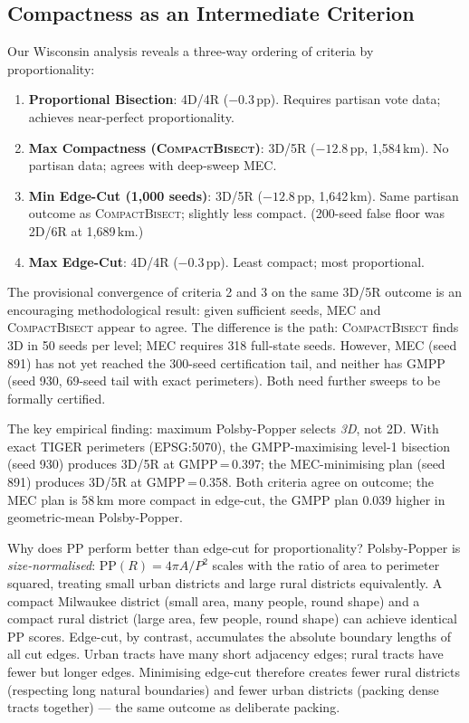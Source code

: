 \subsection{Compactness as an Intermediate Criterion}

Our Wisconsin analysis reveals a three-way ordering of criteria by
proportionality:

\begin{enumerate}
  \item \textbf{Proportional Bisection}: 4D/4R ($-0.3$\,pp). Requires
        partisan vote data; achieves near-perfect proportionality.
  \item \textbf{Max Compactness (\textsc{CompactBisect})}: 3D/5R ($-12.8$\,pp,
        1{,}584\,km). No partisan data; agrees with deep-sweep MEC.
  \item \textbf{Min Edge-Cut (1{,}000 seeds)}: 3D/5R ($-12.8$\,pp, 1{,}642\,km).
        Same partisan outcome as \textsc{CompactBisect}; slightly less compact.
        (200-seed false floor was 2D/6R at 1{,}689\,km.)
  \item \textbf{Max Edge-Cut}: 4D/4R ($-0.3$\,pp). Least compact; most proportional.
\end{enumerate}

The provisional convergence of criteria 2 and 3 on the same 3D/5R outcome
is an encouraging methodological result: given sufficient seeds, MEC and
\textsc{CompactBisect} appear to agree. The difference is the path:
\textsc{CompactBisect} finds 3D in 50 seeds per level; MEC requires 318
full-state seeds. However, MEC (seed 891) has not yet reached the 300-seed
certification tail, and neither has GMPP (seed 930, 69-seed tail with exact
perimeters). Both need further sweeps to be formally certified.

The key empirical finding: maximum Polsby-Popper selects \emph{3D}, not 2D.
With exact TIGER perimeters (EPSG:5070), the GMPP-maximising level-1 bisection
(seed 930) produces 3D/5R at GMPP\,=\,0.397; the MEC-minimising plan (seed 891)
produces 3D/5R at GMPP\,=\,0.358. Both criteria agree on outcome; the
MEC plan is 58\,km more compact in edge-cut, the GMPP plan 0.039 higher in
geometric-mean Polsby-Popper.

Why does PP perform better than edge-cut for proportionality?
Polsby-Popper is \emph{size-normalised}: $\mathrm{PP}(R) = 4\pi A / P^2$
scales with the ratio of area to perimeter squared, treating small urban
districts and large rural districts equivalently. A compact Milwaukee
district (small area, many people, round shape) and a compact rural district
(large area, few people, round shape) can achieve identical PP scores.
Edge-cut, by contrast, accumulates the absolute boundary lengths of all cut
edges. Urban tracts have many short adjacency edges; rural tracts have fewer
but longer edges. Minimising edge-cut therefore creates fewer rural districts
(respecting long natural boundaries) and fewer urban districts (packing dense
tracts together) --- the same outcome as deliberate packing.

